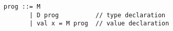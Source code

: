 {\small
\begin{verbatim}
prog ::= M              
       | D prog          // type declaration
       | val x = M prog  // value declaration
\end{verbatim}
}
